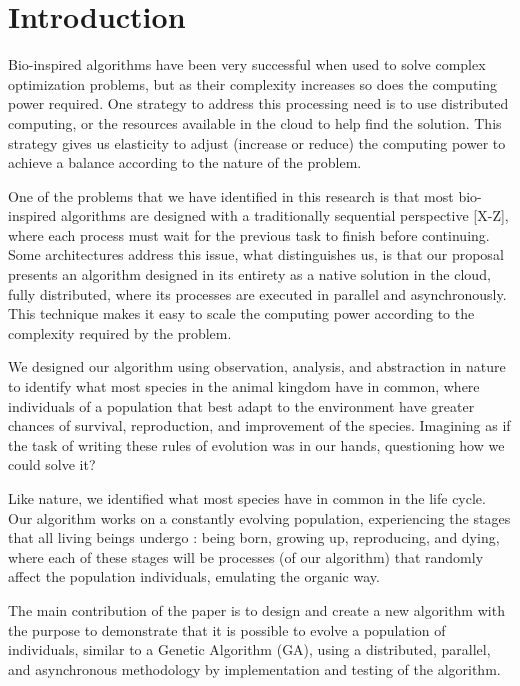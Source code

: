 \documentclass[runningheads]{llncs}
\begin{document}
\section{Introduction} 

Bio-inspired algorithms have been very successful when used to solve complex
optimization problems, but as their complexity increases so does the computing
power required. One strategy to address this processing need is to use
distributed computing, or the resources available in the cloud to help find the
solution. This strategy gives us elasticity to adjust (increase or reduce) the
computing power to achieve a balance according to the nature of the problem.

One of the problems that we have identified in this research is that most
bio-inspired algorithms are designed with a traditionally sequential
perspective [X-Z], where each process must wait for the previous task to finish
before continuing. Some architectures address this issue, what distinguishes
us, is that our proposal presents an algorithm designed in its entirety as a
native solution in the cloud, fully distributed, where its processes are
executed in parallel and asynchronously. This technique makes it easy to scale
the computing power according to the complexity required by the problem.

We designed our algorithm using observation, analysis, and abstraction in
nature to identify what most species in the animal kingdom have in common,
where individuals of a population that best adapt to the environment have
greater chances of survival, reproduction, and improvement of the species.
Imagining as if the task of writing these rules of evolution was in our hands,
questioning how we could solve it?

Like nature, we identified what most species have in common in the life cycle.
Our algorithm works on a constantly evolving population, experiencing the
stages that all living beings undergo \cite{read1968system}: being born,
growing up, reproducing, and dying, where each of these stages will be
processes (of our algorithm) that randomly affect the population individuals,
emulating the organic way.

The main contribution of the paper is to design and create a new algorithm with
the purpose to demonstrate that it is possible to evolve a population of
individuals, similar to a Genetic Algorithm (GA), using a distributed,
parallel, and asynchronous methodology by implementation and testing of the
algorithm. 
\end{document}
